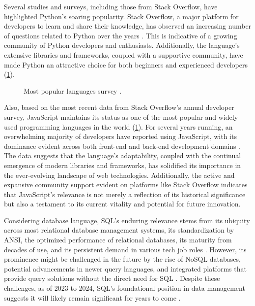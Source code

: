 \documentclass[10pt,twocolumn,twoside]{article}
\begin{document}
Several studies and surveys, including those from Stack Overflow, have highlighted Python's soaring popularity. Stack Overflow, a major platform for developers to learn and share their knowledge, has observed an increasing number of questions related to Python over the years \citep{stackoverflow2017}. This is indicative of a growing community of Python developers and enthusiasts. Additionally, the language's extensive libraries and frameworks, coupled with a supportive community, have made Python an attractive choice for both beginners and experienced developers (\cref{fig:languages}).

\begin{figure}[H]
	\centering
	\caption{Most popular languages survey \citep{stackoverflow2019,stackoverflow2022}.}
	\label{fig:languages}
\end{figure}

Also, based on the most recent data from Stack Overflow's annual developer survey, JavaScript maintains its status as one of the most popular and widely used programming languages in the world (\cref{fig:languages}). For several years running, an overwhelming majority of developers have reported using JavaScript, with its dominance evident across both front-end and back-end development domains \citep{jsstate2021}. The data suggests that the language's adaptability, coupled with the continual emergence of modern libraries and frameworks, has solidified its importance in the ever-evolving landscape of web technologies. Additionally, the active and expansive community support evident on platforms like Stack Overflow indicates that JavaScript's relevance is not merely a reflection of its historical significance but also a testament to its current vitality and potential for future innovation.

Considering database language, SQL's enduring relevance stems from its ubiquity across most relational database management systems, its standardization by ANSI, the optimized performance of relational databases, its maturity from decades of use, and its persistent demand in various tech job roles \citep{winand2012}. However, its prominence might be challenged in the future by the rise of NoSQL databases, potential advancements in newer query languages, and integrated platforms that provide query solutions without the direct need for SQL \citep{avantika2022}. Despite these challenges, as of 2023 to 2024, SQL's foundational position in data management suggests it will likely remain significant for years to come \citep{stackoverflow2022}.
\end{document}
